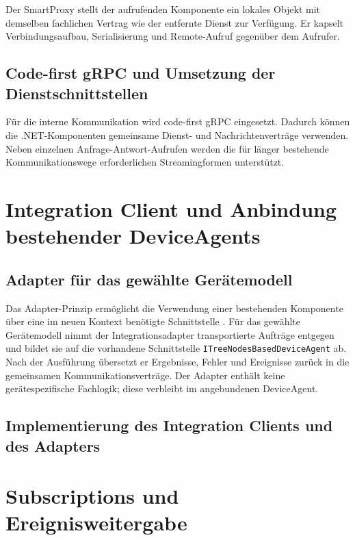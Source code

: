 Der SmartProxy stellt der aufrufenden Komponente ein lokales Objekt mit demselben fachlichen Vertrag wie der entfernte Dienst zur Verfügung. Er kapselt Verbindungsaufbau, Serialisierung und Remote-Aufruf gegenüber dem Aufrufer.

\subsection{Code-first gRPC und Umsetzung der Dienstschnittstellen}

Für die interne Kommunikation wird code-first gRPC eingesetzt. Dadurch können die .NET-Komponenten gemeinsame Dienst- und Nachrichtenverträge verwenden. Neben einzelnen Anfrage-Antwort-Aufrufen werden die für länger bestehende Kommunikationswege erforderlichen Streamingformen unterstützt.

\section{Integration Client und Anbindung bestehender DeviceAgents}

\subsection{Adapter für das gewählte Gerätemodell}

Das Adapter-Prinzip ermöglicht die Verwendung einer bestehenden Komponente über eine im neuen Kontext benötigte Schnittstelle \cite{gammaDesignPatterns}. Für das gewählte Gerätemodell nimmt der Integrationsadapter transportierte Aufträge entgegen und bildet sie auf die vorhandene Schnittstelle \texttt{ITreeNodesBasedDeviceAgent} ab. Nach der Ausführung übersetzt er Ergebnisse, Fehler und Ereignisse zurück in die gemeinsamen Kommunikationsverträge. Der Adapter enthält keine gerätespezifische Fachlogik; diese verbleibt im angebundenen DeviceAgent.

\subsection{Implementierung des Integration Clients und des Adapters}

\section{Subscriptions und Ereignisweitergabe}

